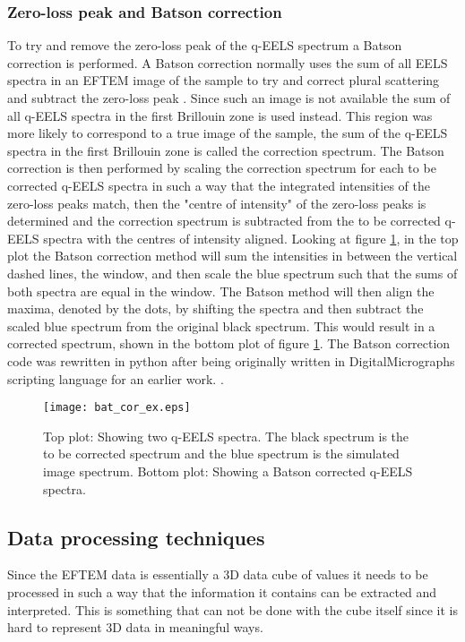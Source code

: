 \begin{multicols}{2}
\subsubsection{Zero-loss peak and Batson correction}
\label{sec:batsen}
To try and remove the zero-loss peak of the q-EELS spectrum a Batson correction is performed. A Batson correction normally uses the sum of all EELS spectra in an EFTEM image of the sample to try and correct plural scattering and subtract the zero-loss peak \cite{PhysRevB.27.5224}. Since such an image is not available the sum of all q-EELS spectra in the first Brillouin zone is used instead. This region was more likely to correspond to a true image of the sample, the sum of the q-EELS spectra in the first Brillouin zone is called the correction spectrum.
The Batson correction is then performed by scaling the correction spectrum for each to be corrected q-EELS spectra in such a way that the integrated intensities of the zero-loss peaks match, then the "centre of intensity" of the zero-loss peaks is determined and the correction spectrum is subtracted from the to be corrected q-EELS spectra with the centres of intensity aligned. Looking at figure \ref{fig:bat-exm}, in the top plot the Batson correction method will sum the intensities in between the vertical dashed lines, the window, and then scale the blue spectrum such that the sums of both spectra are equal in the window. The Batson method will then align the maxima, denoted by the dots, by shifting the spectra and then subtract the scaled blue spectrum from the original black spectrum. This would result in a corrected spectrum, shown in the bottom plot of figure \ref{fig:bat-exm}.
The Batson correction code was rewritten in python after being originally written in DigitalMicrographs scripting language for an earlier work. \cite{Politano2017}.\\
%
\begin{figure}[H]
	\centering
	\captionsetup{width=0.9\linewidth}
	\texttt{[image: bat\_cor\_ex.eps]}
	\caption{Top plot: Showing two q-EELS spectra. The black spectrum is the to be corrected spectrum and the blue spectrum is the simulated image spectrum. Bottom plot: Showing a Batson corrected q-EELS spectra. }
	\label{fig:bat-exm}
\end{figure}
%
\newpage
\subsection{Data processing techniques}
Since the EFTEM data is essentially a 3D data cube of values it needs to be processed in such a way that the information it contains can be extracted and interpreted. This is something that can not be done with the cube itself since it is hard to represent 3D data in meaningful ways.\\
%

\end{multicols}
